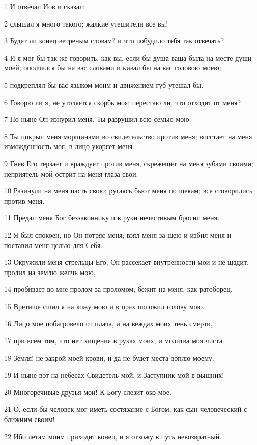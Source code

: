 \par 1 И отвечал Иов и сказал:
\par 2 слышал я много такого; жалкие утешители все вы!
\par 3 Будет ли конец ветреным словам? и что побудило тебя так отвечать?
\par 4 И я мог бы так же говорить, как вы, если бы душа ваша была на месте души моей; ополчался бы на вас словами и кивал бы на вас головою моею;
\par 5 подкреплял бы вас языком моим и движением губ утешал бы.
\par 6 Говорю ли я, не утоляется скорбь моя; перестаю ли, что отходит от меня?
\par 7 Но ныне Он изнурил меня. Ты разрушил всю семью мою.
\par 8 Ты покрыл меня морщинами во свидетельство против меня; восстает на меня изможденность моя, в лицо укоряет меня.
\par 9 Гнев Его терзает и враждует против меня, скрежещет на меня зубами своими; неприятель мой острит на меня глаза свои.
\par 10 Разинули на меня пасть свою; ругаясь бьют меня по щекам; все сговорились против меня.
\par 11 Предал меня Бог беззаконнику и в руки нечестивым бросил меня.
\par 12 Я был спокоен, но Он потряс меня; взял меня за шею и избил меня и поставил меня целью для Себя.
\par 13 Окружили меня стрельцы Его; Он рассекает внутренности мои и не щадит, пролил на землю желчь мою,
\par 14 пробивает во мне пролом за проломом, бежит на меня, как ратоборец.
\par 15 Вретище сшил я на кожу мою и в прах положил голову мою.
\par 16 Лицо мое побагровело от плача, и на веждах моих тень смерти,
\par 17 при всем том, что нет хищения в руках моих, и молитва моя чиста.
\par 18 Земля! не закрой моей крови, и да не будет места воплю моему.
\par 19 И ныне вот на небесах Свидетель мой, и Заступник мой в вышних!
\par 20 Многоречивые друзья мои! К Богу слезит око мое.
\par 21 О, если бы человек мог иметь состязание с Богом, как сын человеческий с ближним своим!
\par 22 Ибо летам моим приходит конец, и я отхожу в путь невозвратный.

